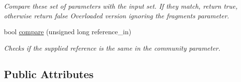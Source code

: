 \begin{DoxyCompactItemize}
\begin{DoxyCompactList}\small\item\em Compare these set of parameters with the input set. If they match, return true, otherwise return false Overloaded version ignoring the fragments parameter. \end{DoxyCompactList}\item 
bool \hyperlink{struct_community_parameters_a40a051953654d97d5d5674875d5692cc}{compare} (unsigned long reference\+\_\+in)
\begin{DoxyCompactList}\small\item\em Checks if the supplied reference is the same in the community parameter. \end{DoxyCompactList}\end{DoxyCompactItemize}
\subsection*{Public Attributes}
